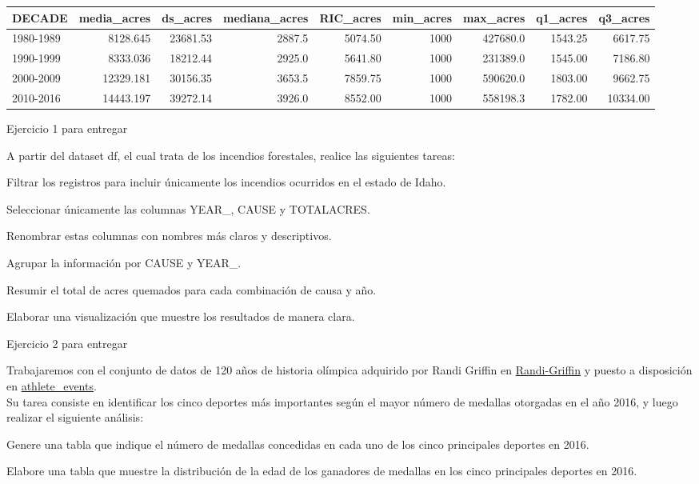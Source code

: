 \documentclass[
]{book}
\begin{document}
\begin{tabular}{l|r|r|r|r|r|r|r|r}
\hline
DECADE & media\_acres & ds\_acres & mediana\_acres & RIC\_acres & min\_acres & max\_acres & q1\_acres & q3\_acres\\
\hline
1980-1989 & 8128.645 & 23681.53 & 2887.5 & 5074.50 & 1000 & 427680.0 & 1543.25 & 6617.75\\
\hline
1990-1999 & 8333.036 & 18212.44 & 2925.0 & 5641.80 & 1000 & 231389.0 & 1545.00 & 7186.80\\
\hline
2000-2009 & 12329.181 & 30156.35 & 3653.5 & 7859.75 & 1000 & 590620.0 & 1803.00 & 9662.75\\
\hline
2010-2016 & 14443.197 & 39272.14 & 3926.0 & 8552.00 & 1000 & 558198.3 & 1782.00 & 10334.00\\
\hline
\end{tabular}

{} Ejercicio 1 para entregar

A partir del dataset df, el cual trata de los incendios forestales, realice las siguientes tareas:

Filtrar los registros para incluir únicamente los incendios ocurridos en el estado de Idaho.

Seleccionar únicamente las columnas YEAR\_, CAUSE y TOTALACRES.

Renombrar estas columnas con nombres más claros y descriptivos.

Agrupar la información por CAUSE y YEAR\_.

Resumir el total de acres quemados para cada combinación de causa y año.

Elaborar una visualización que muestre los resultados de manera clara.

{} Ejercicio 2 para entregar

Trabajaremos con el conjunto de datos de 120 años de historia olímpica adquirido por Randi Griffin en
\href{https://www.sports-reference.com/}{Randi-Griffin} y puesto a disposición en \href{https://raw.githubusercontent.com/cdeoroaguado/Datos/refs/heads/main/dataviz/athlete_events.csv}{athlete\_events}.\\
Su tarea consiste en identificar los cinco deportes más importantes según el mayor número de medallas otorgadas en el año 2016,
y luego realizar el siguiente análisis:

Genere una tabla que indique el número de medallas concedidas en cada uno de los cinco principales deportes en 2016.

Elabore una tabla que muestre la distribución de la edad de los ganadores de medallas en los cinco principales deportes en 2016.
\end{document}
